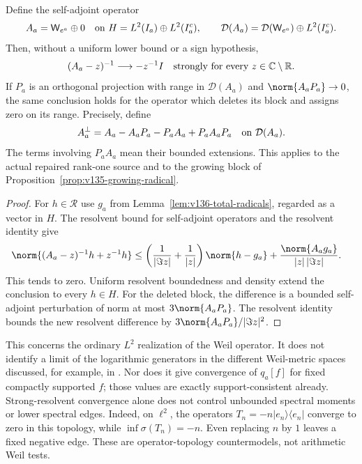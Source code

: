 \begin{proposition}
\label{prop:v136-resolvent-collapse}
Define the self-adjoint operator
\[
 A_a=\mathsf W_{e^a}\oplus0
 \quad\hbox{on }H=L^2(I_a)\oplus L^2(I_a^c),
 \qquad
 \mathcal D(A_a)=\mathcal D(\mathsf W_{e^a})\oplus L^2(I_a^c).
\]
Then, without a uniform lower bound or a sign hypothesis,
\begin{equation}\label{eq:v136-resolvent-collapse}
 (A_a-z)^{-1}\longrightarrow-z^{-1}I
 \quad\hbox{strongly for every }z\in\mathbb C\setminus\mathbb R.
\end{equation}
If $P_a$ is an orthogonal projection with range in $\mathcal D(A_a)$
and $\norm{A_aP_a}\to0$, the same conclusion holds for the operator
which deletes its block and assigns zero on its range. Precisely, define
\[
 A_a^{\perp}=A_a-A_aP_a-P_aA_a+P_aA_aP_a
 \quad\hbox{on }\mathcal D(A_a).
\]
The terms involving $P_aA_a$ mean their bounded extensions.
This applies to the actual repaired rank-one source and to the growing
block of Proposition~\ref{prop:v135-growing-radical}.
\end{proposition}
\begin{proof}
For $h\in\mathcal R$ use $g_a$ from Lemma~\ref{lem:v136-total-radicals},
regarded as a vector in $H$. The resolvent bound for self-adjoint
operators and the resolvent identity give
\begin{align*}
 \norm{(A_a-z)^{-1}h+z^{-1}h}
 &\le\left(\frac1{|\Im z|}+\frac1{|z|}\right)\norm{h-g_a}
       +\frac{\norm{A_ag_a}}{|z|\,|\Im z|}.
\end{align*}
This tends to zero. Uniform resolvent boundedness and density extend
the conclusion to every $h\in H$. For the deleted block, the difference
is a bounded self-adjoint perturbation of norm at most
$3\norm{A_aP_a}$. The resolvent identity bounds the new resolvent
difference by $3\norm{A_aP_a}/|\Im z|^2$.
\end{proof}

This concerns the ordinary $L^2$ realization of the Weil operator.
It does not identify a limit of the logarithmic generators in the
different Weil-metric spaces discussed, for example, in
\cite[Section 7]{Suzuki2026Screw}. Nor does it give convergence of
$q_a[f]$ for fixed compactly supported $f$; those values are exactly
support-consistent already. Strong-resolvent convergence alone does
not control unbounded spectral moments or lower spectral edges.
Indeed, on $\ell^2$, the operators
$T_n=-n|e_n\rangle\langle e_n|$ converge to zero in this topology,
while $\inf\sigma(T_n)=-n$. Even replacing $n$ by $1$ leaves a
fixed negative edge. These are operator-topology countermodels,
not arithmetic Weil tests.

